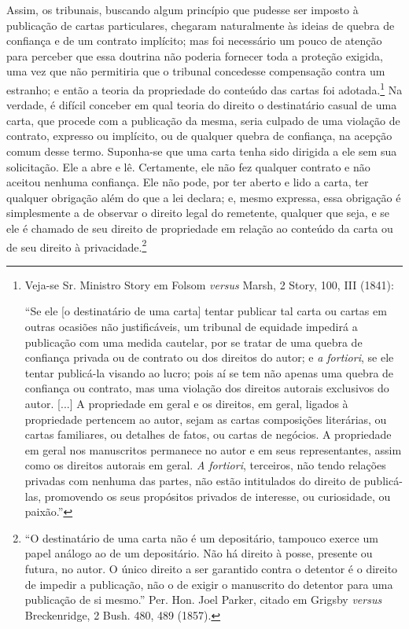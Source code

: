 Assim, os tribunais, buscando algum princípio que pudesse ser imposto à
publicação de cartas particulares, chegaram naturalmente às ideias de
quebra de confiança e de um contrato implícito; mas foi necessário um
pouco de atenção para perceber que essa doutrina não poderia fornecer
toda a proteção exigida, uma vez que não permitiria que o tribunal
concedesse compensação contra um estranho; e então a teoria da
propriedade do conteúdo das cartas foi adotada.\footnote{Veja-se Sr.
  Ministro Story em Folsom \emph{versus} Marsh, 2 Story, 100, III
  (1841):

  ``Se ele {[}o destinatário de uma carta{]} tentar publicar tal carta
  ou cartas em outras ocasiões não justificáveis, um tribunal de
  equidade impedirá a publicação com uma medida cautelar, por se tratar
  de uma quebra de confiança privada ou de contrato ou dos direitos do
  autor; e \emph{a fortiori}, se ele tentar publicá-la visando ao lucro;
  pois aí se tem não apenas uma quebra de confiança ou contrato, mas uma
  violação dos direitos autorais exclusivos do autor. {[}...{]} A
  propriedade em geral e os direitos, em geral, ligados à propriedade
  pertencem ao autor, sejam as cartas composições literárias, ou cartas
  familiares, ou detalhes de fatos, ou cartas de negócios. A propriedade
  em geral nos manuscritos permanece no autor e em seus representantes,
  assim como os direitos autorais em geral. \emph{A fortiori},
  terceiros, não tendo relações privadas com nenhuma das partes, não
  estão intitulados do direito de publicá-las, promovendo os seus
  propósitos privados de interesse, ou curiosidade, ou paixão.''} Na
verdade, é difícil conceber em qual teoria do direito o destinatário
casual de uma carta, que procede com a publicação da mesma, seria
culpado de uma violação de contrato, expresso ou implícito, ou de
qualquer quebra de confiança, na acepção comum desse termo. Suponha-se
que uma carta tenha sido dirigida a ele sem sua solicitação. Ele a abre
e lê. Certamente, ele não fez qualquer contrato e não aceitou nenhuma
confiança. Ele não pode, por ter aberto e lido a carta, ter qualquer
obrigação além do que a lei declara; e, mesmo expressa, essa obrigação é
simplesmente a de observar o direito legal do remetente, qualquer que
seja, e se ele é chamado de seu direito de propriedade em relação ao
conteúdo da carta ou de seu direito à privacidade.\footnote{``O
  destinatário de uma carta não é um depositário, tampouco exerce um
  papel análogo ao de um depositário. Não há direito à posse, presente
  ou futura, no autor. O único direito a ser garantido contra o detentor
  é o direito de impedir a publicação, não o de exigir o manuscrito do
  detentor para uma publicação de si mesmo.'' Per. Hon. Joel Parker,
  citado em Grigsby \emph{versus} Breckenridge, 2 Bush. 480, 489 (1857).}

